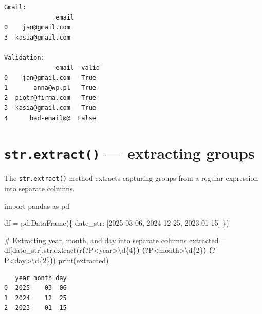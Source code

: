 \documentclass[
  english,
  letterpaper,
  DIV=11,
  numbers=noendperiod]{scrreprt}
\newenvironment{Shaded}{\begin{snugshade}}{\end{snugshade}}
\newcommand{\BuiltInTok}[1]{\textcolor[rgb]{0.00,0.23,0.31}{#1}}
\newcommand{\CommentTok}[1]{\textcolor[rgb]{0.37,0.37,0.37}{#1}}
\newcommand{\DecValTok}[1]{\textcolor[rgb]{0.68,0.00,0.00}{#1}}
\newcommand{\FunctionTok}[1]{\textcolor[rgb]{0.28,0.35,0.67}{#1}}
\newcommand{\ImportTok}[1]{\textcolor[rgb]{0.00,0.46,0.62}{#1}}
\newcommand{\KeywordTok}[1]{\textcolor[rgb]{0.00,0.23,0.31}{\textbf{#1}}}
\newcommand{\NormalTok}[1]{\textcolor[rgb]{0.00,0.23,0.31}{#1}}
\newcommand{\OperatorTok}[1]{\textcolor[rgb]{0.37,0.37,0.37}{#1}}
\newcommand{\StringTok}[1]{\textcolor[rgb]{0.13,0.47,0.30}{#1}}
\newcommand{\VerbatimStringTok}[1]{\textcolor[rgb]{0.13,0.47,0.30}{#1}}
\begin{document}
\begin{verbatim}
Gmail:
              email
0    jan@gmail.com
3  kasia@gmail.com

Validation:
              email  valid
0    jan@gmail.com   True
1       anna@wp.pl   True
2  piotr@firma.com   True
3  kasia@gmail.com   True
4      bad-email@@  False
\end{verbatim}

\section{\texorpdfstring{\texttt{str.extract()} --- extracting
groups}{str.extract() --- extracting groups}}\label{str.extract-extracting-groups}

The \texttt{str.extract()} method extracts capturing groups from a
regular expression into separate columns.

\begin{Shaded}
\begin{Highlighting}[]
\ImportTok{import}\NormalTok{ pandas }\ImportTok{as}\NormalTok{ pd}

\NormalTok{df }\OperatorTok{=}\NormalTok{ pd.DataFrame(\{}
    \StringTok{\textquotesingle{}date\_str\textquotesingle{}}\NormalTok{: [}\StringTok{\textquotesingle{}2025{-}03{-}06\textquotesingle{}}\NormalTok{, }\StringTok{\textquotesingle{}2024{-}12{-}25\textquotesingle{}}\NormalTok{, }\StringTok{\textquotesingle{}2023{-}01{-}15\textquotesingle{}}\NormalTok{]}
\NormalTok{\})}

\CommentTok{\# Extracting year, month, and day into separate columns}
\NormalTok{extracted }\OperatorTok{=}\NormalTok{ df[}\StringTok{\textquotesingle{}date\_str\textquotesingle{}}\NormalTok{].}\BuiltInTok{str}\NormalTok{.extract(}\VerbatimStringTok{r\textquotesingle{}}\KeywordTok{(}\FunctionTok{?P\textless{}year\textgreater{}}\DecValTok{\textbackslash{}d}\OperatorTok{\{4\}}\KeywordTok{)}\VerbatimStringTok{{-}}\KeywordTok{(}\FunctionTok{?P\textless{}month\textgreater{}}\DecValTok{\textbackslash{}d}\OperatorTok{\{2\}}\KeywordTok{)}\VerbatimStringTok{{-}}\KeywordTok{(}\FunctionTok{?P\textless{}day\textgreater{}}\DecValTok{\textbackslash{}d}\OperatorTok{\{2\}}\KeywordTok{)}\VerbatimStringTok{\textquotesingle{}}\NormalTok{)}
\BuiltInTok{print}\NormalTok{(extracted)}
\end{Highlighting}
\end{Shaded}

\begin{verbatim}
   year month day
0  2025    03  06
1  2024    12  25
2  2023    01  15
\end{verbatim}
\end{document}
